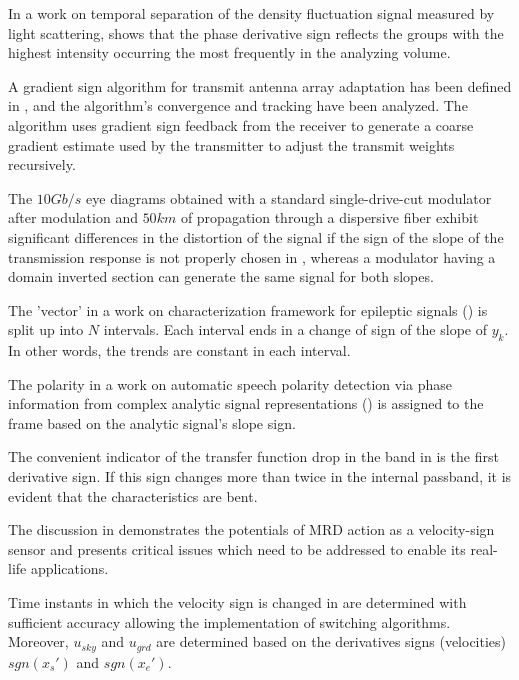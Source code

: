 \documentclass[11pt]{book}
\begin{document}
In a work on temporal separation of the density fluctuation signal measured by light
scattering, \cite{antar1999temporal} shows that the phase derivative sign reflects the
groups with the highest intensity occurring the most frequently in
the analyzing volume.

A gradient sign algorithm for transmit antenna array adaptation has
been defined in \cite{banister2003simple}, and the algorithm's convergence
and tracking have been analyzed. The algorithm uses gradient sign
feedback from the receiver to generate a coarse gradient estimate
used by the transmitter to adjust the transmit weights recursively.

The $10Gb/s$ eye diagrams obtained with a standard single-drive-cut
modulator after modulation and $50km$ of propagation through a dispersive
fiber exhibit significant differences in the distortion of the signal
if the sign of the slope of the transmission response is not properly
chosen in \cite{courjal2004modeling}, whereas a modulator having
a domain inverted section can generate the same signal for both slopes.

The 'vector' in a work on characterization framework for epileptic signals (\cite{vazquez2012characterisation}) is split up into
$N$ intervals. Each interval ends in a change of sign of the slope
of $y_{k}$. In other words, the trends are constant in each interval.

The polarity in a work on automatic speech polarity detection via phase information from complex analytic signal representations (\cite{govind2014automatic}) is assigned to the frame
based on the analytic signal's slope sign.

The convenient indicator of the transfer function drop in the band
in \cite{vreznivcek2016amti} is the first derivative sign. If this
sign changes more than twice in the internal passband, it is evident
that the characteristics are bent.

The discussion in \cite{sapinski2017laboratory} demonstrates the
potentials of MRD action as a velocity-sign sensor and presents critical
issues which need to be addressed to enable its real-life applications.

Time instants in which the velocity sign is changed in \cite{rosol2019ability}
are determined with sufficient accuracy allowing the implementation
of switching algorithms. Moreover, $u_{sky}$ and $u_{grd}$ are determined
based on the derivatives signs (velocities) $sgn\left(x_{s}'\right)$
and $sgn\left(x_{e}'\right)$.
\end{document}
